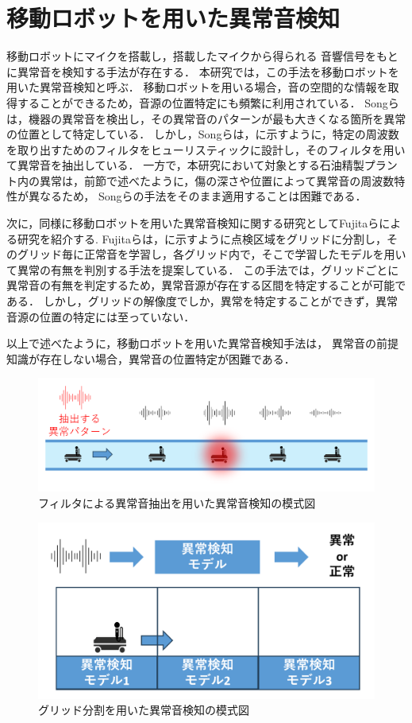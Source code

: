\documentclass[../main]{subfiles}
\begin{document}
\section{移動ロボットを用いた異常音検知}
\label{sec:related_work_mobile}

移動ロボットにマイクを搭載し，搭載したマイクから得られる
音響信号をもとに異常音を検知する手法が存在する．
本研究では，この手法を移動ロボットを用いた異常音検知と呼ぶ．
移動ロボットを用いる場合，音の空間的な情報を取得することができるため，音源の位置特定にも頻繁に利用されている．
Songらは，機器の異常音を検出し，その異常音のパターンが最も大きくなる箇所を異常の位置として特定している．\cite{9023943}
しかし，Songらは，に示すように，特定の周波数を取り出すためのフィルタをヒューリスティックに設計し，そのフィルタを用いて異常音を抽出している．
一方で，本研究において対象とする石油精製プラント内の異常は，前節で述べたように，傷の深さや位置によって異常音の周波数特性が異なるため，
Songらの手法をそのまま適用することは困難である．

次に，同様に移動ロボットを用いた異常音検知に関する研究としてFujitaらによる研究を紹介する\cite{10202270}.
Fujitaらは，に示すように点検区域をグリッドに分割し，そのグリッド毎に正常音を学習し，各グリッド内で，そこで学習したモデルを用いて異常の有無を判別する手法を提案している．
この手法では，グリッドごとに異常音の有無を判定するため，異常音源が存在する区間を特定することが可能である．
しかし，グリッドの解像度でしか，異常を特定することができず，異常音源の位置の特定には至っていない．

以上で述べたように，移動ロボットを用いた異常音検知手法は，
異常音の前提知識が存在しない場合，異常音の位置特定が困難である．

\begin{figure}[t]
  \centering
  \includegraphics[keepaspectratio, width=1.0\linewidth]{chap2/supervised_prev_research.png}
  \caption{フィルタによる異常音抽出を用いた異常音検知の模式図}
  \label{fig:supervised_prev_research}
\end{figure}

\begin{figure}[t]
  \centering
  \includegraphics[keepaspectratio, width=1.0\linewidth]{chap2/fujita_previous_research.png}
  \caption{グリッド分割を用いた異常音検知の模式図}
  \label{fig:fujita_previous_research}
\end{figure}
\end{document}
